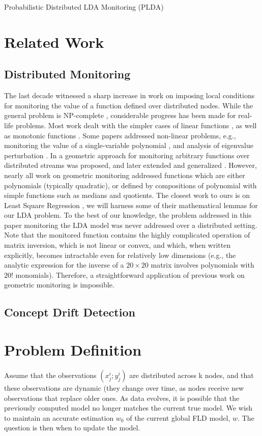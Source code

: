 \documentclass[11pt,twocolumn,varwidth=true,a4paper,fleqn]{article}
\begin{document}
Probabilistic Distributed LDA Monitoring (PLDA)


\section{Related Work}
\subsection{Distributed Monitoring}
The last decade witnessed a sharp increase in work on imposing local conditions for monitoring the value of a function
defined over distributed nodes. While the general problem is NP-complete
\cite{keren2014geometric}, considerable progress has been made for real-life problems. Most work dealt with the simpler cases of
linear functions \cite{keralapura2006communication, kashyap2008efficient}, as well as monotonic
functions \cite{michel2005klee}.
Some papers addressed non-linear problems, e.g., monitoring
the value of a single-variable polynomial \cite{shah2008handling}, and analysis
of eigenvalue perturbation \cite{huang2007communication}. 
In \cite{sharfman2007geometric} a geometric approach for monitoring arbitrary functions over distributed
streams was proposed, and later extended and generalized
\cite{keren2012shape,lazerson2015monitoring}. However, nearly all work on geometric monitoring addressed
functions which are either polynomials (typically quadratic), or defined by
compositions of polynomial with simple functions such as medians and quotients. 
The closest work to ours is on Least Square Regression
\cite{gabel2015monitoring}, we will harness some of their mathematical lemmas
for our LDA problem. To the best of our knowledge, the problem addressed in this
paper monitoring the LDA model was never addressed over a distributed setting. Note
that the monitored function contains the highly complicated
operation of matrix inversion, which is not linear or convex,
and which, when written explicitly, becomes intractable even
for relatively low dimensions (e.g., the analytic expression
for the inverse of a $20 \times 20$ matrix involves polynomials with
$20!$ monomials). Therefore, a straightforward application of
previous work on geometric monitoring is impossible.
\subsection{Concept Drift Detection}
\section{Problem Definition}
Assume that the observations ${(x^i_j; y^i_j)}$ are distributed across k nodes, 
and that these observations are dynamic (they change over time, as nodes receive 
new observations that replace older ones. As data evolves, it is possible that the
previously computed model no longer matches the current true model. We wish to maintain 
an accurate estimation $w_0$ of the current global FLD model, $w$. 
The question is then when to update the model.
\end{document}
